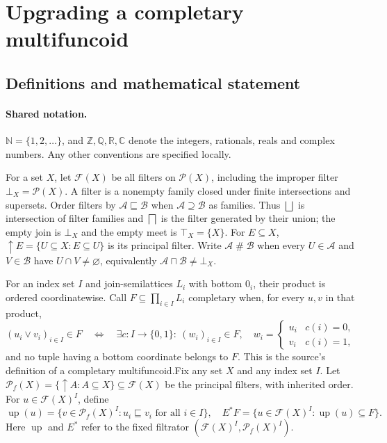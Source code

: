 \documentclass[11pt]{article}
\begin{document}
\section{Upgrading a completary multifuncoid}\label{statement}

\subsection{Definitions and mathematical statement}

\paragraph{Shared notation.}$\mathbb N=\{1,2,\ldots\}$, and $\mathbb Z,\mathbb Q,\mathbb R,\mathbb C$ denote the integers, rationals, reals and complex numbers. Any other conventions are specified locally.


For a set $X$, let $\mathcal F(X)$ be all filters on $\mathcal P(X)$, including the improper filter $\bot_X=\mathcal P(X)$. A filter is a nonempty family closed under finite intersections and supersets. Order filters by $\mathcal A\sqsubseteq\mathcal B$ when $\mathcal A\supseteq\mathcal B$ as families. Thus $\bigsqcup$ is intersection of filter families and $\bigsqcap$ is the filter generated by their union; the empty join is $\bot_X$ and the empty meet is $\top_X=\{X\}$. For $E\subseteq X$, $\uparrow E=\{U\subseteq X:E\subseteq U\}$ is its principal filter. Write $\mathcal A\mathrel{\#}\mathcal B$ when every $U\in\mathcal A$ and $V\in\mathcal B$ have $U\cap V\ne\varnothing$, equivalently $\mathcal A\sqcap\mathcal B\ne\bot_X$.

For an index set $I$ and join-semilattices $L_i$ with bottom $0_i$, their product is ordered coordinatewise. Call $F\subseteq\prod_{i\in I}L_i$ completary when, for every $u,v$ in that product,
\[
 (u_i\vee v_i)_{i\in I}\in F
 \quad\Longleftrightarrow\quad
 \exists c:I\to\{0,1\}:\ (w_i)_{i\in I}\in F,
 \quad w_i=\begin{cases}u_i&c(i)=0,\\v_i&c(i)=1,\end{cases}
\]
and no tuple having a bottom coordinate belongs to $F$. This is the source's definition of a completary multifuncoid.Fix any set $X$ and any index set $I$. Let $\mathcal P_f(X)=\{\uparrow A:A\subseteq X\}\subseteq\mathcal F(X)$ be the principal filters, with inherited order. For $u\in\mathcal F(X)^I$, define
\[
 \operatorname{up}(u)=\{v\in\mathcal P_f(X)^I:u_i\sqsubseteq v_i\text{ for all }i\in I\},
 \quad E^*F=\{u\in\mathcal F(X)^I:\operatorname{up}(u)\subseteq F\}.
\]
Here $\operatorname{up}$ and $E^*$ refer to the fixed filtrator $(\mathcal F(X)^I,\mathcal P_f(X)^I)$.
\end{document}
